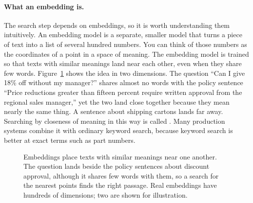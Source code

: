 \paragraph{What an embedding is.} The search step depends on embeddings, so it is worth understanding them intuitively. An embedding model is a separate, smaller model that turns a piece of text into a list of several hundred numbers. You can think of those numbers as the coordinates of a point in a space of meaning. The embedding model is trained so that texts with similar meanings land near each other, even when they share few words. Figure~\ref{fig:embedding} shows the idea in two dimensions. The question ``Can I give 18\% off without my manager?'' shares almost no words with the policy sentence ``Price reductions greater than fifteen percent require written approval from the regional sales manager,'' yet the two land close together because they mean nearly the same thing. A sentence about shipping cartons lands far away. Searching by closeness of meaning in this way is called . Many production systems combine it with ordinary keyword search, because keyword search is better at exact terms such as part numbers.

\begin{figure}[htbp]
\centering
{}
\caption{Embeddings place texts with similar meanings near one another. The question lands beside the policy sentences about discount approval, although it shares few words with them, so a search for the nearest points finds the right passage. Real embeddings have hundreds of dimensions; two are shown for illustration.}
\label{fig:embedding}
\end{figure}

